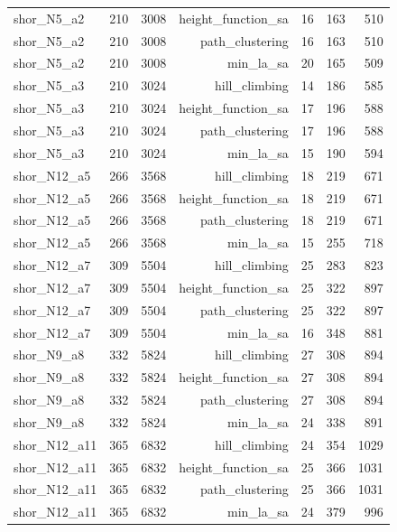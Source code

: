 \begin{longtable}{lrrrrrr}
  shor\_N5\_a2 & 210 & 3008 & height\_function\_sa & 16 & 163 & 510 \\
  shor\_N5\_a2 & 210 & 3008 & path\_clustering & 16 & 163 & 510 \\
  shor\_N5\_a2 & 210 & 3008 & min\_la\_sa & 20 & 165 & 509 \\
  shor\_N5\_a3 & 210 & 3024 & hill\_climbing & 14 & 186 & 585 \\
  shor\_N5\_a3 & 210 & 3024 & height\_function\_sa & 17 & 196 & 588 \\
  shor\_N5\_a3 & 210 & 3024 & path\_clustering & 17 & 196 & 588 \\
  shor\_N5\_a3 & 210 & 3024 & min\_la\_sa & 15 & 190 & 594 \\
  shor\_N12\_a5 & 266 & 3568 & hill\_climbing & 18 & 219 & 671 \\
  shor\_N12\_a5 & 266 & 3568 & height\_function\_sa & 18 & 219 & 671 \\
  shor\_N12\_a5 & 266 & 3568 & path\_clustering & 18 & 219 & 671 \\
  shor\_N12\_a5 & 266 & 3568 & min\_la\_sa & 15 & 255 & 718 \\
  shor\_N12\_a7 & 309 & 5504 & hill\_climbing & 25 & 283 & 823 \\
  shor\_N12\_a7 & 309 & 5504 & height\_function\_sa & 25 & 322 & 897 \\
  shor\_N12\_a7 & 309 & 5504 & path\_clustering & 25 & 322 & 897 \\
  shor\_N12\_a7 & 309 & 5504 & min\_la\_sa & 16 & 348 & 881 \\
  shor\_N9\_a8 & 332 & 5824 & hill\_climbing & 27 & 308 & 894 \\
  shor\_N9\_a8 & 332 & 5824 & height\_function\_sa & 27 & 308 & 894 \\
  shor\_N9\_a8 & 332 & 5824 & path\_clustering & 27 & 308 & 894 \\
  shor\_N9\_a8 & 332 & 5824 & min\_la\_sa & 24 & 338 & 891 \\
  shor\_N12\_a11 & 365 & 6832 & hill\_climbing & 24 & 354 & 1029 \\
  shor\_N12\_a11 & 365 & 6832 & height\_function\_sa & 25 & 366 & 1031 \\
  shor\_N12\_a11 & 365 & 6832 & path\_clustering & 25 & 366 & 1031 \\
  shor\_N12\_a11 & 365 & 6832 & min\_la\_sa & 24 & 379 & 996 \\
\end{longtable}